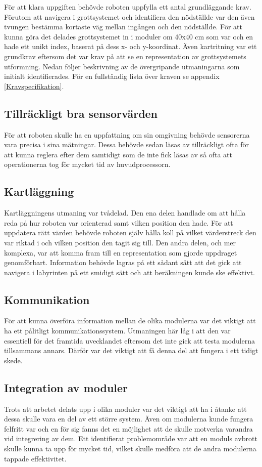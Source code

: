 \documentclass[11pt]{article}
\begin{document}
\begin{flushleft}
För att klara uppgiften behövde roboten uppfylla ett antal grundläggande krav. Förutom att navigera i grottsystemet och identifiera den nödställde var den även tvungen bestämma kortaste väg mellan ingången och den nödställde. För att kunna göra det delades grottsystemet in i moduler om 40x40 cm som var och en hade ett unikt index, baserat på dess x- och y-koordinat. Även kartritning var ett grundkrav eftersom det var krav på att se en representation av grottsystemets utformning. Nedan följer beskrivning av de övergripande utmaningarna som initialt identifierades. För en fullständig lista över kraven se appendix \ref{Kravspecifikation}.

\subsection{Tillräckligt bra sensorvärden}
För att roboten skulle ha en uppfattning om sin omgivning behövde sensorerna vara precisa i sina mätningar. Dessa behövde sedan läsas av tillräckligt ofta för att kunna reglera efter dem samtidigt som de inte fick läsas av så ofta att operationerna tog för mycket tid av huvudprocessorn.

\subsection{Kartläggning}
Kartläggningens utmaning var tvådelad. Den ena delen handlade om att hålla reda på hur roboten var orienterad samt vilken position den hade. För att uppdatera rätt värden behövde roboten själv hålla koll på vilket värderstreck den var riktad i och vilken position den tagit sig till. Den andra delen, och mer komplexa, var att komma fram till en representation som gjorde uppdraget genomförbart. Information behövde lagras på ett sådant sätt att det gick att navigera i labyrinten på ett smidigt sätt och att beräkningen kunde ske effektivt.

\subsection{Kommunikation}
För att kunna överföra information mellan de olika modulerna var det viktigt att ha ett pålitligt kommunikationssystem. Utmaningen här låg i att den var essentiell för det framtida uvecklandet eftersom det inte gick att testa modulerna tillsammans annars. Därför var det viktigt att få denna del att fungera i ett tidigt skede.

\subsection{Integration av moduler}
Trots att arbetet delats upp i olika moduler var det viktigt att ha i åtanke att dessa skulle vara en del av ett större system. Även om modulerna kunde fungera felfritt var och en för sig fanns det en möjlighet att de skulle motverka varandra vid integrering av dem. Ett identifierat problemområde var att en moduls avbrott skulle kunna ta upp för mycket tid, vilket skulle medföra att de andra modulerna tappade effektivitet. 


\end{flushleft}
\end{document}
